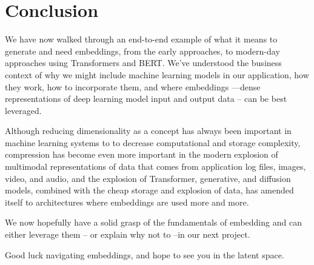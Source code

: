 \documentclass[11pt, table]{diazessay} %
\begin{document}
\begin{sloppypar}

\section{Conclusion}

We have now walked through an end-to-end example of what it means to generate and need embeddings, from the early approaches, to modern-day approaches using Transformers and BERT. We've understood the business context of why we might include machine learning models in our application, how they work, how to incorporate them, and where embeddings ---dense representations of deep learning model input and output data -- can be best leveraged.  

Although reducing dimensionality as a concept has always been important in machine learning systems to to decrease computational and storage complexity, compression has become even more important in the modern explosion of multimodal representations of data that comes from application log files, images, video, and audio, and the explosion of Transformer, generative, and diffusion models, combined with the cheap storage and explosion of data, has amended itself to architectures where embeddings are used more and more. 

We now hopefully have a solid grasp of the fundamentals of embedding and can either leverage them -- or explain why not to --in our next project. 
 
Good luck navigating embeddings, and hope to see you in the latent space. 


\newpage


\newpage



\end{sloppypar}
\end{document}
